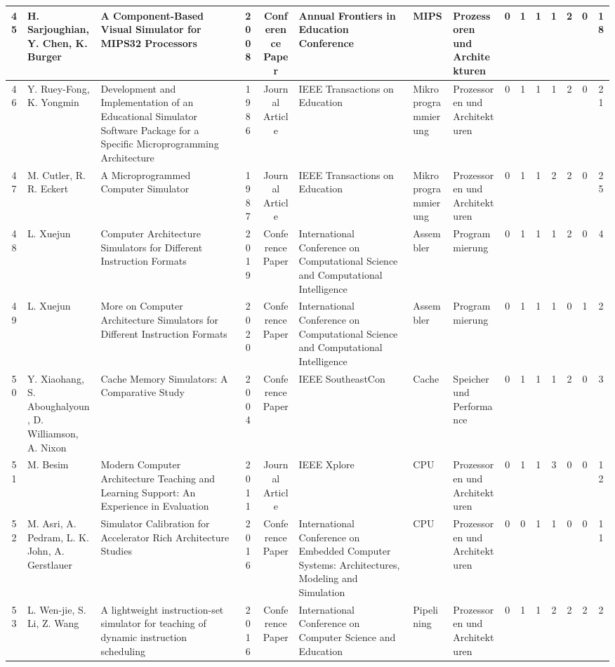 \begin{landscape}
\begin{longtable}{|c|p{2cm}|p{2cm}|c|c|p{2cm}|p{1cm}|p{1cm}|c|c|c|c|c|c|c|}
    45 & H. Sarjoughian, Y. Chen, K. Burger & A Component-Based Visual Simulator for MIPS32 Processors & 2008 & Conference Paper & Annual Frontiers in Education Conference & MIPS & Prozessoren und Architekturen & 0 & 1 & 1 & 1 & 2 & 0 & 18 \\ \hline
    46 & Y. Ruey-Fong, K. Yongmin & Development and Implementation of an Educational Simulator Software Package for a Specific Microprogramming Architecture & 1986 & Journal Article & IEEE Transactions on Education & Mikroprogrammierung & Prozessoren und Architekturen & 0 & 1 & 1 & 1 & 2 & 0 & 21 \\ \hline
    47 & M. Cutler, R. R. Eckert & A Microprogrammed Computer Simulator & 1987 & Journal Article & IEEE Transactions on Education & Mikroprogrammierung & Prozessoren und Architekturen & 0 & 1 & 1 & 2 & 2 & 0 & 25 \\ \hline
    48 & L. Xuejun & Computer Architecture Simulators for Different Instruction Formats & 2019 & Conference Paper & International Conference on Computational Science and Computational Intelligence & Assembler & Programmierung & 0 & 1 & 1 & 1 & 2 & 0 & 4 \\ \hline
    49 & L. Xuejun & More on Computer Architecture Simulators for Different Instruction Formats & 2020 & Conference Paper & International Conference on Computational Science and Computational Intelligence & Assembler & Programmierung & 0 & 1 & 1 & 1 & 0 & 1 & 2 \\ \hline
    50 & Y. Xiaohang, S. Aboughalyoun, D. Williamson, A. Nixon & Cache Memory Simulators: A Comparative Study & 2004 & Conference Paper & IEEE SoutheastCon & Cache & Speicher und Performance & 0 & 1 & 1 & 1 & 2 & 0 & 3 \\ \hline
    51 & M. Besim & Modern Computer Architecture Teaching and Learning Support: An Experience in Evaluation & 2011 & Journal Article & IEEE Xplore & CPU & Prozessoren und Architekturen & 0 & 1 & 1 & 3 & 0 & 0 & 12 \\ \hline
    52 & M. Asri, A. Pedram, L. K. John, A. Gerstlauer & Simulator Calibration for Accelerator Rich Architecture Studies & 2016 & Conference Paper & International Conference on Embedded Computer Systems: Architectures, Modeling and Simulation & CPU & Prozessoren und Architekturen & 0 & 0 & 1 & 1 & 0 & 0 & 11 \\ \hline
    53 & L. Wen-jie, S. Li, Z. Wang & A lightweight instruction-set simulator for teaching of dynamic instruction scheduling & 2016 & Conference Paper & International Conference on Computer Science and Education & Pipelining & Prozessoren und Architekturen & 0 & 1 & 1 & 2 & 2 & 2 & 2 \\ \hline

\end{longtable}
\end{landscape}
